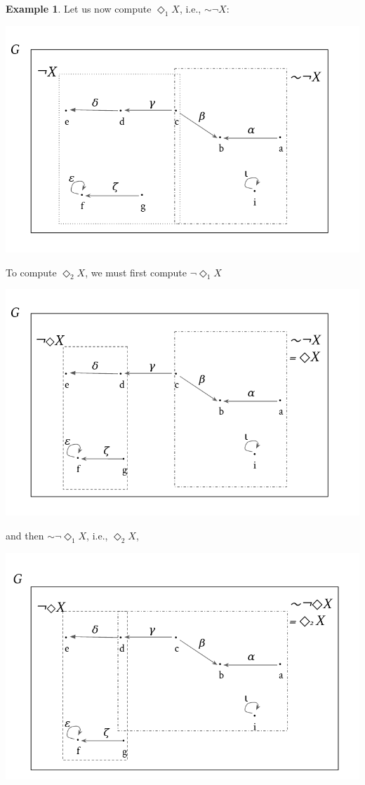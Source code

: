 \documentclass[11pt]{book}
\theoremstyle{definition}
\newtheorem{example}{Example}[section]
\theoremstyle{definition}
\theoremstyle{definition}
\theoremstyle{theorem}
\theoremstyle{definition}
\begin{document}
\begin{example}
	\par    
	Let us now compute $\Diamond_1 X$, i.e., $\sim \neg X$:
	\begin{center}
		\includegraphics*[scale=0.24]{GraphSubgraphNegation4.png}
	\end{center}  
	To compute $\Diamond_2 X$, we must first compute $ \neg \Diamond_1 X$
	\begin{center}
		\includegraphics*[scale=0.24]{GraphSubgraphNegation5.png}
	\end{center}  
	and then $\sim \neg \Diamond_1 X$, i.e., $\Diamond_2 X$, 
	\begin{center}
		\includegraphics*[scale=0.24]{GraphSubgraphNegation6.png}

\end{center}
\end{example}
\end{document}
